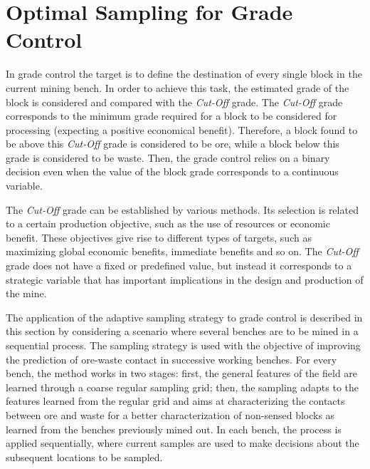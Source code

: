 
\section{Optimal Sampling for Grade Control}
\label{sec_os_grade_control_PII}

In grade control the target is to define the destination of every single block in the current mining bench. In order to achieve this task, the estimated grade  of the block is considered and compared with the  \emph{Cut-Off} grade. The \emph{Cut-Off} grade corresponds to the minimum grade required for a block to be considered for processing (expecting a positive economical benefit). Therefore, a block found to be above this \emph{Cut-Off} grade is considered to be ore, while a block below this grade is considered to be waste. Then, the grade control relies on a binary decision even when the value of the block grade corresponds to a continuous variable. 

The \emph{Cut-Off} grade can be established by various methods. Its selection is related to a certain production objective, such as the use of resources or economic benefit. These objectives give rise to different types of targets, such as maximizing global economic benefits, immediate benefits and so on. The  \emph{Cut-Off} grade does not have a fixed or predefined value, but instead it corresponds to a strategic variable that has important implications in the design and production of the mine.

The application of the adaptive sampling strategy to grade control is described in this section by considering a scenario where several benches are to be mined in a sequential process. The sampling strategy is used with the objective of improving the prediction of ore-waste contact in successive working benches. 
For every bench, the method works in two stages: first, the general features of the field are learned through a coarse regular sampling grid; then, the sampling adapts to the features learned from the regular grid and aims at characterizing the contacts between ore and waste for a better characterization of non-sensed blocks as learned from the benches previously mined out. In each bench, the process is applied sequentially, where current samples are used to make decisions about the subsequent locations to be sampled.  %

